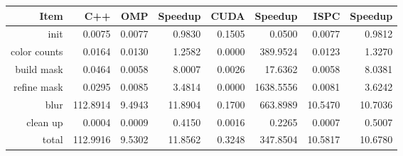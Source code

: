 \documentclass[12pt]{article}
\begin{document}
\begin{tabular}{r|r|r|r|r|r|r|r}
    Item & C++ & OMP & Speedup & CUDA & Speedup & ISPC & Speedup
\\  \hline
    init & 0.0075 & 0.0077 & 0.9830 & 0.1505 & 0.0500 & 0.0077 & 0.9812
\\  color counts & 0.0164 & 0.0130 & 1.2582 & 0.0000 & 389.9524 & 0.0123 & 1.3270
\\  build mask & 0.0464 & 0.0058 & 8.0007 & 0.0026 & 17.6362 & 0.0058 & 8.0381
\\  refine mask & 0.0295 & 0.0085 & 3.4814 & 0.0000 & 1638.5556 & 0.0081 & 3.6242
\\  blur & 112.8914 & 9.4943 & 11.8904 & 0.1700 & 663.8989 & 10.5470 & 10.7036
\\  clean up & 0.0004 & 0.0009 & 0.4150 & 0.0016 & 0.2265 & 0.0007 & 0.5007
\\  \hline
    total & 112.9916 & 9.5302 & 11.8562 & 0.3248 & 347.8504 & 10.5817 & 10.6780
\end{tabular}
\end{document}
